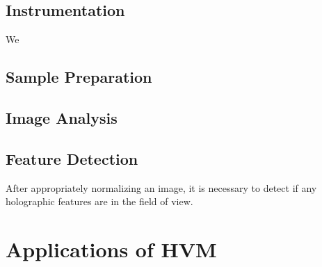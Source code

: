 \subsection{Instrumentation}

We


\subsection{Sample Preparation}




\subsection{Image Analysis}


\subsection{Feature Detection}

After appropriately normalizing an image, it is necessary to detect if any holographic
features are in the field of view. 


\section{Applications of HVM}

